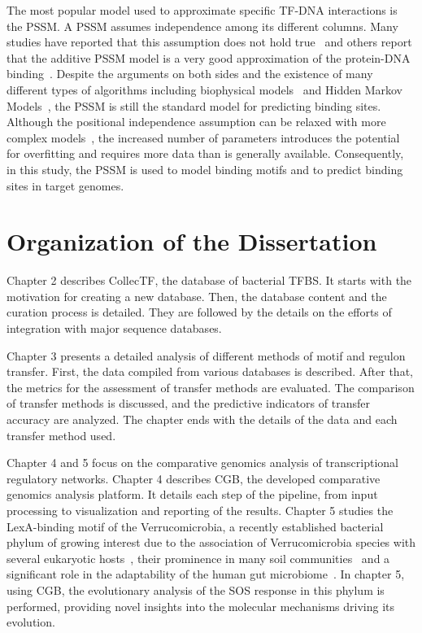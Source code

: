 The most popular model used to approximate specific TF-DNA interactions is the
PSSM\@. A PSSM assumes independence among its different columns. Many studies
have reported that this assumption does not hold true~\citep{man2001non,
  bulyk2002nucleotides, tomovic2007position, osada2004comparative} and others
report that the additive PSSM model is a very good approximation of the
protein-DNA binding~\citep{benos2002additivity}. Despite the arguments on both
sides and the existence of many different types of algorithms including
biophysical models~\citep{stormo1998specificity, djordjevic2003biophysical} and
Hidden Markov Models~\citep{sinha2003probabilistic, drawid2009ohmm,
  salzberg1998microbial}, the PSSM is still the standard model for predicting
binding sites. Although the positional independence assumption can be relaxed
with more complex models~\citep{ben2005identification, zhao2012improved,
  siddharthan2010dinucleotide, barash2003modeling}, the increased number of
parameters introduces the potential for overfitting and requires more data than
is generally available. Consequently, in this study, the PSSM is used to model
binding motifs and to predict binding sites in target genomes.

\section{Organization of the Dissertation}

Chapter 2 describes CollecTF, the database of bacterial TFBS. It starts with
the motivation for creating a new database. Then, the database content and the
curation process is detailed. They are followed by the details on the efforts
of integration with major sequence databases.

Chapter 3 presents a detailed analysis of different methods of motif and
regulon transfer. First, the data compiled from various databases is
described. After that, the metrics for the assessment of transfer methods are
evaluated. The comparison of transfer methods is discussed, and the predictive
indicators of transfer accuracy are analyzed. The chapter ends with the details
of the data and each transfer method used.

Chapter 4 and 5 focus on the comparative genomics analysis of transcriptional
regulatory networks. Chapter 4 describes CGB, the developed comparative
genomics analysis platform. It details each step of the pipeline, from input
processing to visualization and reporting of the results. Chapter 5 studies the
LexA-binding motif of the Verrucomicrobia, a recently established bacterial
phylum of growing interest due to the association of Verrucomicrobia species
with several eukaryotic hosts~\citep{sait2011genomic}, their prominence in many
soil communities~\citep{bergmann2011under} and a significant role in the
adaptability of the human gut microbiome~\citep{dubourg2013high}. In chapter 5,
using CGB, the evolutionary analysis of the SOS response in this phylum is
performed, providing novel insights into the molecular mechanisms driving its
evolution.
